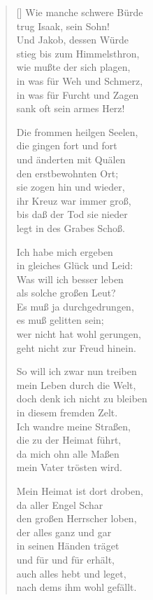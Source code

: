 \begin{multicols}{2}
\begin{verse}[\versewidth]
 Wie manche schwere Bürde\\
trug Isaak, sein Sohn!\\
Und Jakob, dessen Würde\\
stieg bis zum Himmelsthron,\\
wie mußte der sich plagen,\\
in was für Weh und Schmerz,\\
in was für Furcht und Zagen\\
sank oft sein armes Herz!

 Die frommen heilgen Seelen,\\
die gingen fort und fort\\
und änderten mit Quälen\\
den erstbewohnten Ort;\\
sie zogen hin und wieder,\\
ihr Kreuz war immer groß,\\
bis daß der Tod sie nieder\\
legt in des Grabes Schoß.

 Ich habe mich ergeben\\
in gleiches Glück und Leid:\\
Was will ich besser leben\\
als solche großen Leut?\\
Es muß ja durchgedrungen,\\
es muß gelitten sein;\\
wer nicht hat wohl gerungen,\\
geht nicht zur Freud hinein.

 So will ich zwar nun treiben\\
mein Leben durch die Welt,\\
doch denk ich nicht zu bleiben\\
in diesem fremden Zelt.\\
Ich wandre meine Straßen,\\
die zu der Heimat führt,\\
da mich ohn alle Maßen\\
mein Vater trösten wird.

 Mein Heimat ist dort droben,\\
da aller Engel Schar\\
den großen Herrscher loben,\\
der alles ganz und gar\\
in seinen Händen träget\\
und für und für erhält,\\
auch alles hebt und leget,\\
nach dems ihm wohl gefällt.


\end{verse}
\end{multicols}
